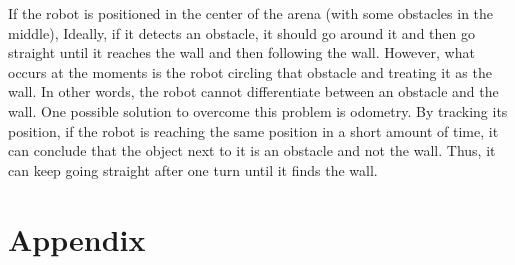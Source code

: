 \documentclass[]{article}
\begin{document}
If the robot is positioned in the center of the arena (with some obstacles in the middle), Ideally, if it detects an obstacle, it should go around it and then go straight until it reaches the wall and then following the wall. However, what occurs at the moments is the robot circling that obstacle and treating it as the wall. In other words, the robot cannot differentiate between an obstacle and the wall. One possible solution to overcome this problem is odometry. By tracking its position, if the robot is reaching the same position in a short amount of time, it can conclude that the object next to it is an obstacle and not the wall. Thus, it can keep going straight after one turn until it finds the wall.

\section{Appendix}

\end{document}
